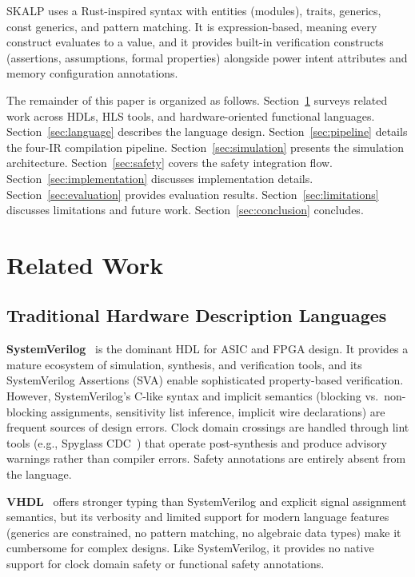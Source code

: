 \documentclass[conference]{IEEEtran}
\begin{document}
SKALP uses a Rust-inspired syntax with entities (modules), traits, generics, const generics, and pattern matching. It is expression-based, meaning every construct evaluates to a value, and it provides built-in verification constructs (assertions, assumptions, formal properties) alongside power intent attributes and memory configuration annotations.

The remainder of this paper is organized as follows. Section~\ref{sec:related} surveys related work across HDLs, HLS tools, and hardware-oriented functional languages. Section~\ref{sec:language} describes the language design. Section~\ref{sec:pipeline} details the four-IR compilation pipeline. Section~\ref{sec:simulation} presents the simulation architecture. Section~\ref{sec:safety} covers the safety integration flow. Section~\ref{sec:implementation} discusses implementation details. Section~\ref{sec:evaluation} provides evaluation results. Section~\ref{sec:limitations} discusses limitations and future work. Section~\ref{sec:conclusion} concludes.

\section{Related Work}
\label{sec:related}

\subsection{Traditional Hardware Description Languages}

\textbf{SystemVerilog}~\cite{ieee1800} is the dominant HDL for ASIC and FPGA design. It provides a mature ecosystem of simulation, synthesis, and verification tools, and its SystemVerilog Assertions (SVA) enable sophisticated property-based verification. However, SystemVerilog's C-like syntax and implicit semantics (blocking vs.\ non-blocking assignments, sensitivity list inference, implicit wire declarations) are frequent sources of design errors. Clock domain crossings are handled through lint tools (e.g., Spyglass CDC~\cite{spyglass}) that operate post-synthesis and produce advisory warnings rather than compiler errors. Safety annotations are entirely absent from the language.

\textbf{VHDL}~\cite{ieee1076} offers stronger typing than SystemVerilog and explicit signal assignment semantics, but its verbosity and limited support for modern language features (generics are constrained, no pattern matching, no algebraic data types) make it cumbersome for complex designs. Like SystemVerilog, it provides no native support for clock domain safety or functional safety annotations.
\end{document}
